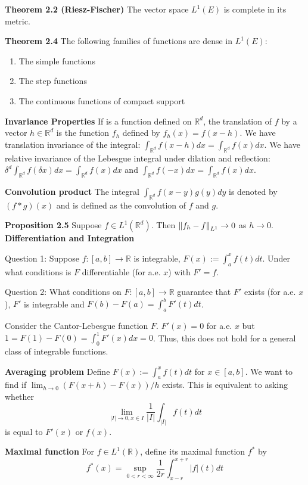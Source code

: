 \documentclass[6pt,landscape]{article}
\begin{document}
\begin{multicols*}{3}
\textbf{Theorem 2.2 (Riesz-Fischer)} The vector space $L^1(E)$ is complete in its metric.

\textbf{Theorem 2.4} The following families of functions are dense in $L^1(E)$:
\begin{enumerate}
	\item The simple functions
	\item The step functions
	\item The continuous functions of compact support
\end{enumerate}

\textbf{Invariance Properties} If is a function defined on $\mathbb{R}^d$, the translation of $f$ by a vector $h\in\mathbb{R}^d$ is the function $f_h$ defined by $f_h(x) = f(x-h)$. We have
translation invariance of the integral: $\int_{\mathbb{R}^d} f(x-h)dx = \int_{\mathbb{R}^d} f(x)dx$. We have relative invariance of the Lebesgue integral under dilation and reflection:
$\delta^d \int_{\mathbb{R}^d} f(\delta x)dx = \int_{\mathbb{R}^d} f(x)dx$ and $\int_{\mathbb{R}^d} f(-x)dx = \int_{\mathbb{R}^d} f(x)dx$.

\textbf{Convolution product} The integral $\int_{\mathbb{R}^d} f(x-y)g(y)dy$ is denoted by $(f * g)(x)$ and is defined as the convolution of $f$ and $g$.

\textbf{Proposition 2.5} Suppose $f\in L^1(\mathbb{R}^d)$. Then $\left\lVert f_h-f\right\rVert_{L^1} \to 0$ as $h\to 0$.\\

\textbf{Differentiation and Integration}
    
Question 1: Suppose $f:[a,b]\to \mathbb{R}$ is integrable, $F(x) := \int_a^x f(t)dt$. Under what conditions is $F$ differentiable (for a.e. $x$) with $F' = f$.

Question 2: What conditions on $F:[a,b]\to\mathbb{R}$ guarantee that $F'$ exists (for a.e. $x$), $F'$ is integrable and $F(b)-F(a) = \int_a^b F'(t)dt$.

Consider the Cantor-Lebesgue function $F$. $F'(x)=0$ for a.e. $x$ but $1 = F(1) - F(0) = \int_0^1 F'(x)dx = 0$. Thus, this does not hold for a general class of integrable functions.

\textbf{Averaging problem} Define $F(x) := \int_a^x f(t)dt$ for $x\in [a,b]$. We want to find if $\lim_{h\to 0} (F(x+h)-F(x))/h$ exists. This is equivalent to asking whether
\[ \lim_{|I|\to 0, x\in I} \frac{1}{|I|} \int_{|I|} f(t)dt \]
is equal to $F'(x)$ or $f(x)$.

\textbf{Maximal function} For $f\in L^1(\mathbb{R})$, define its maximal function $f^{*}$ by
\[ f^{*}(x) = \sup_{0<r<\infty} \frac{1}{2r}\int_{x-r}^{x+r} |f|(t)dt \]


\end{multicols*}
\end{document}
